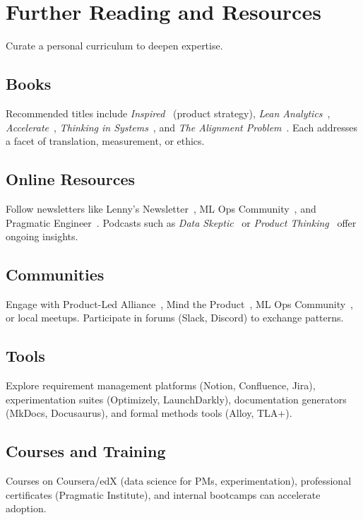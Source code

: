 \section{Further Reading and Resources}
\label{sec:resources}

Curate a personal curriculum to deepen expertise.

\subsection{Books}
Recommended titles include \textit{Inspired}~\parencite{cagan2017inspired} (product strategy), \textit{Lean Analytics}~\parencite{croll2013lean}, \textit{Accelerate}~\parencite{forsgren2018accelerate}, \textit{Thinking in Systems}~\parencite{meadows2008thinking}, and \textit{The Alignment Problem}~\parencite{christiano2020alignment}. Each addresses a facet of translation, measurement, or ethics.

\subsection{Online Resources}
Follow newsletters like Lenny's Newsletter~\parencite{rachitsky2024lenny}, ML Ops Community~\parencite{mlopscommunity}, and Pragmatic Engineer~\parencite{pragmaticengineer}. Podcasts such as \textit{Data Skeptic}~\parencite{dataskepticpodcast} or \textit{Product Thinking}~\parencite{productthinkingpodcast} offer ongoing insights.

\subsection{Communities}
Engage with Product-Led Alliance~\parencite{productledalliance}, Mind the Product~\parencite{mindtheproduct}, ML Ops Community~\parencite{mlopscommunity}, or local meetups. Participate in forums (Slack, Discord) to exchange patterns.

\subsection{Tools}
Explore requirement management platforms (Notion, Confluence, Jira), experimentation suites (Optimizely, LaunchDarkly), documentation generators (MkDocs, Docusaurus), and formal methods tools (Alloy, TLA+).

\subsection{Courses and Training}
Courses on Coursera/edX (data science for PMs, experimentation), professional certificates (Pragmatic Institute), and internal bootcamps can accelerate adoption.

